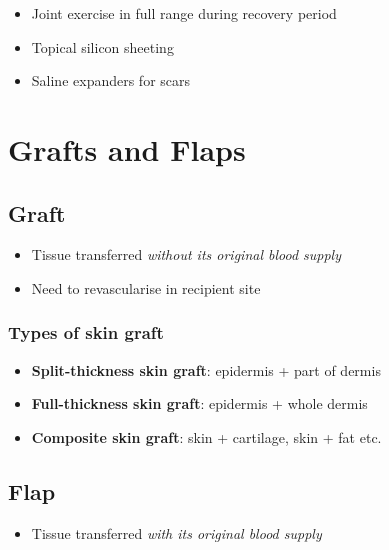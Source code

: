 \documentclass[
  12pt,
]{memoir}
\providecommand{\tightlist}{%
  \setlength{\itemsep}{0pt}\setlength{\parskip}{0pt}}
\begin{document}
\begin{itemize}
\tightlist
\item
  Joint exercise in full range during recovery period
\item
  Topical silicon sheeting
\item
  Saline expanders for scars
\end{itemize}

\pagebreak

\hypertarget{grafts-and-flaps}{%
\chapter{Grafts and Flaps}\label{grafts-and-flaps}}

\hypertarget{graft}{%
\section{Graft}\label{graft}}

\begin{itemize}
\tightlist
\item
  Tissue transferred \emph{without its original blood supply}
\item
  Need to revascularise in recipient site
\end{itemize}

\hypertarget{types-of-skin-graft}{%
\subsection{Types of skin graft}\label{types-of-skin-graft}}

\begin{itemize}
\tightlist
\item
  \textbf{Split-thickness skin graft}: epidermis + part of dermis
\item
  \textbf{Full-thickness skin graft}: epidermis + whole dermis
\item
  \textbf{Composite skin graft}: skin + cartilage, skin + fat etc.
\end{itemize}

\hypertarget{flap}{%
\section{Flap}\label{flap}}

\begin{itemize}
\tightlist
\item
  Tissue transferred \emph{with its original blood supply}
\end{itemize}
\end{document}

